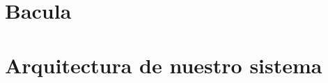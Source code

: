 \documentclass[12pt,a4paper]{article}
\begin{document}
\section{Bacula}                                                         %





\section{Arquitectura de nuestro sistema}                                %
\end{document}
